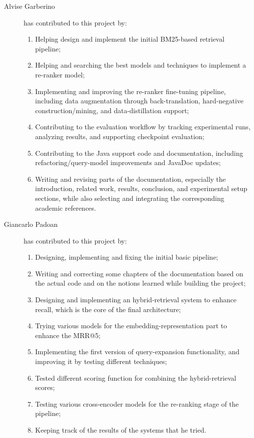 \begin{description}
    \item[Alvise Garberino] has contributed to this project by:
    \begin{enumerate}
        \item Helping design and implement the initial BM25-based retrieval pipeline;
        \item Helping and searching the best models and techniques to implement a re-ranker model;
        \item Implementing and improving the re-ranker fine-tuning pipeline, including data augmentation through back-translation, hard-negative construction/mining, and data-distillation support;
        \item Contributing to the evaluation workflow by tracking experimental runs, analyzing results, and supporting checkpoint evaluation;
        \item Contributing to the Java support code and documentation, including refactoring/query-model improvements and JavaDoc updates;
        \item Writing and revising parts of the documentation, especially the introduction, related work, results, conclusion, and experimental setup sections, while also selecting and integrating the corresponding academic references.
    \end{enumerate}

    \item[Giancarlo Padoan] has contributed to this project by:
    \begin{enumerate}
        \item Designing, implementing and fixing the initial basic pipeline;
        \item Writing and correcting some chapters of the documentation based on the actual code and on the notions learned while building the project;
        \item Designing and implementing an hybrid-retrieval system to enhance recall, which is the core of the final architecture;
        \item Trying various models for the embedding-representation part to enhance the MRR@5;
        \item Implementing the first version of query-expansion functionality, and improving it by testing different techniques;
        \item Tested different scoring function for combining the hybrid-retrieval scores;
        \item Testing various cross-encoder models for the re-ranking stage of the pipeline;
        \item Keeping track of the results of the systems that he tried.
    \end{enumerate}


\end{description}
